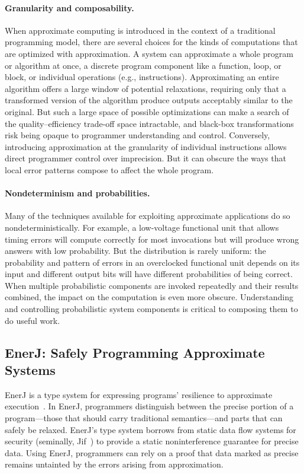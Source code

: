 \paragraph{Granularity and composability.}

When approximate computing is introduced in the context of a traditional
programming model, there are several choices for the kinds of computations
that are optimized with approximation. A system can approximate a whole
program or algorithm at once, a discrete program component like a function,
loop, or block, or individual operations (e.g., instructions).
Approximating an entire algorithm 
offers a large window of potential relaxations,
requiring only that a transformed version of the algorithm produce outputs
acceptably similar to the original.
But such a large space of possible optimizations can make a search of the
quality--efficiency trade-off space intractable, and black-box transformations
risk being opaque to programmer understanding and control.
Conversely, introducing approximation at the granularity of individual
instructions allows direct programmer control over imprecision. But it can
obscure the ways that local error patterns compose to affect the whole
program.

\paragraph{Nondeterminism and probabilities.}

Many of the techniques available for exploiting approximate applications do so
nondeterministically. For example, a low-voltage functional unit that allows
timing errors will compute correctly for most invocations but will produce wrong
answers with low probability. But the distribution is rarely uniform: the
probability and pattern of errors in an overclocked functional unit depends on
its input and different output bits will have different probabilities of being
correct. When multiple probabilistic components are invoked repeatedly and
their results combined, the impact on the computation is even more obscure.
Understanding and controlling probabilistic system components is critical to
composing them to do useful work.

\subsection{EnerJ: Safely Programming Approximate Systems}
\label{sec:prelim:enerj}

EnerJ is a type system for expressing programs' resilience to approximate
execution~\cite{enerj}. In EnerJ, programmers distinguish between the precise
portion of a program---those that should carry traditional semantics---and
parts that can safely be relaxed. EnerJ's type system borrows from static data
flow systems for security (seminally, Jif~\cite{jif}) to provide a static
noninterference guarantee for precise data. Using EnerJ, programmers can rely
on a proof that data marked as precise remains untainted by the errors arising
from approximation.

